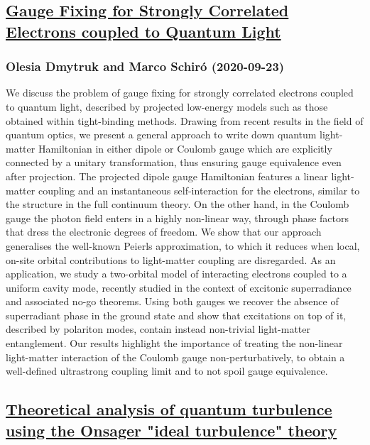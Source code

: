 \subsection*{\href{http://arxiv.org/abs/2009.11088v1}{Gauge Fixing for Strongly Correlated Electrons coupled to Quantum Light}}
\subsubsection*{Olesia Dmytruk and Marco Schiró (2020-09-23)}
We discuss the problem of gauge fixing for strongly correlated electrons
coupled to quantum light, described by projected low-energy models such as
those obtained within tight-binding methods. Drawing from recent results in the
field of quantum optics, we present a general approach to write down quantum
light-matter Hamiltonian in either dipole or Coulomb gauge which are explicitly
connected by a unitary transformation, thus ensuring gauge equivalence even
after projection. The projected dipole gauge Hamiltonian features a linear
light-matter coupling and an instantaneous self-interaction for the electrons,
similar to the structure in the full continuum theory. On the other hand, in
the Coulomb gauge the photon field enters in a highly non-linear way, through
phase factors that dress the electronic degrees of freedom. We show that our
approach generalises the well-known Peierls approximation, to which it reduces
when local, on-site orbital contributions to light-matter coupling are
disregarded. As an application, we study a two-orbital model of interacting
electrons coupled to a uniform cavity mode, recently studied in the context of
excitonic superradiance and associated no-go theorems. Using both gauges we
recover the absence of superradiant phase in the ground state and show that
excitations on top of it, described by polariton modes, contain instead
non-trivial light-matter entanglement. Our results highlight the importance of
treating the non-linear light-matter interaction of the Coulomb gauge
non-perturbatively, to obtain a well-defined ultrastrong coupling limit and to
not spoil gauge equivalence.

\subsection*{\href{http://arxiv.org/abs/2009.11057v1}{Theoretical analysis of quantum turbulence using the Onsager "ideal  turbulence" theory}}
